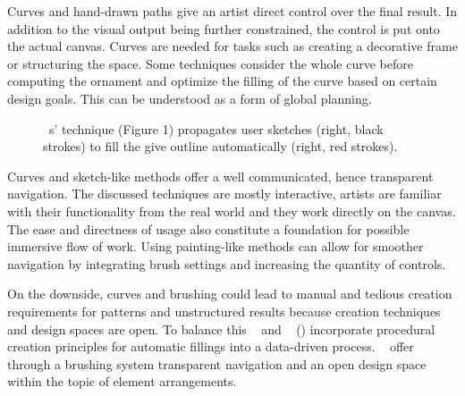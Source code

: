 Curves and hand-drawn paths give an artist direct control over the final result. In addition to the visual output being further constrained, the control is put onto the actual canvas. Curves are needed for tasks such as creating a decorative frame or structuring the space. Some techniques consider the whole curve before computing the ornament and optimize the filling of the curve based on certain design goals. This can be understood as a form of global planning. 

\begin{figure}[H]
    \centering
    \caption{\label{fig:xing_2014_apr}\citeauthor*{xing_2014_apr}~\cite{xing_2014_apr}s' technique (Figure 1) propagates user sketches (right, black strokes) to fill the give outline automatically (right, red strokes).}
\end{figure}

Curves and sketch-like methods offer a well communicated, hence transparent navigation. The discussed techniques are mostly interactive, artists are familiar with their functionality from the real world and they work directly on the canvas. The ease and directness of usage also constitute a foundation for possible immersive flow of work. Using painting-like methods can allow for smoother navigation by integrating brush settings and increasing the quantity of controls. 

On the downside, curves and brushing could lead to manual and tedious creation requirements for patterns and unstructured results because creation techniques and design spaces are open. To balance this \citeauthor*{kazi_2012_vit}~\cite{kazi_2012_vit} and \citeauthor*{xing_2014_apr}~\cite{xing_2014_apr} () incorporate procedural creation principles for automatic fillings into a data-driven process. \citeauthor*{hsu_2020_aef}~\cite{hsu_2020_aef} offer through a brushing system transparent navigation and an open design space within the topic of element arrangements. 

